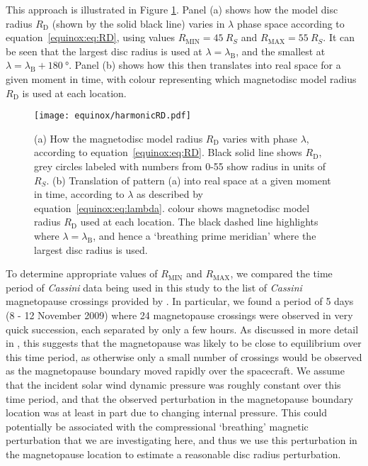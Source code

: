 This approach is illustrated in Figure \ref{equinox:fig:harmonicRD}. Panel (a) shows how the model disc radius $R_\mathrm{D}$ (shown by the solid black line) varies in $\lambda$ phase space according to equation~\ref{equinox:eq:RD}, using values $R_\mathrm{MIN}=\SI{45}{R_S}$ and $R_\mathrm{MAX}=\SI{55}{R_S}$. It can be seen that the largest disc radius is used at $\lambda=\lambda_\mathrm{B}$, and the smallest at $\lambda=\lambda_\mathrm{B}+\SI{180}{\degree}$. Panel (b) shows how this then translates into real space for a given moment in time, with colour representing which magnetodisc model radius $R_\mathrm{D}$ is used at each location.
\begin{figure}
\centering
\texttt{[image: equinox/harmonicRD.pdf]}
\caption[Diagram showing how magnetodisc model radius $R_\mathrm{D}$ varies with phase, to represent breathing.]{(a) How the magnetodisc model radius $R_\mathrm{D}$ varies with phase $\lambda$, according to equation~\ref{equinox:eq:RD}. Black solid line shows $R_\mathrm{D}$, grey circles labeled with numbers from 0-55 show radius in units of $\si{R_S}$. (b) Translation of pattern (a) into real space at a given moment in time, according to $\lambda$ as described by equation~\ref{equinox:eq:lambda}. colour shows magnetodisc model radius $R_\mathrm{D}$ used at each location. The black dashed line highlights where $\lambda=\lambda_\mathrm{B}$, and hence a `breathing prime meridian' where the largest disc radius is used.}
\label{equinox:fig:harmonicRD}
\end{figure}

To determine appropriate values of $R_\mathrm{MIN}$ and $R_\mathrm{MAX}$, we compared the time period of \textit{Cassini} data being used in this study to the list of \textit{Cassini} magnetopause crossings provided by \citet{pilkington2015}. In particular, we found a period of 5 days (8 - 12 November 2009) where 24 magnetopause crossings were observed in very quick succession, each separated by only a few hours. As discussed in more detail in \citet{pilkington2015}, this suggests that the magnetopause was likely to be close to equilibrium over this time period, as otherwise only a small number of crossings would be observed as the magnetopause boundary moved rapidly over the spacecraft. We assume that the incident solar wind dynamic pressure was roughly constant over this time period, and that the observed perturbation in the magnetopause boundary location was at least in part due to changing internal pressure. This could potentially be associated with the compressional `breathing' magnetic perturbation that we are investigating here, and thus we use this perturbation in the magnetopause location to estimate a reasonable disc radius perturbation.

